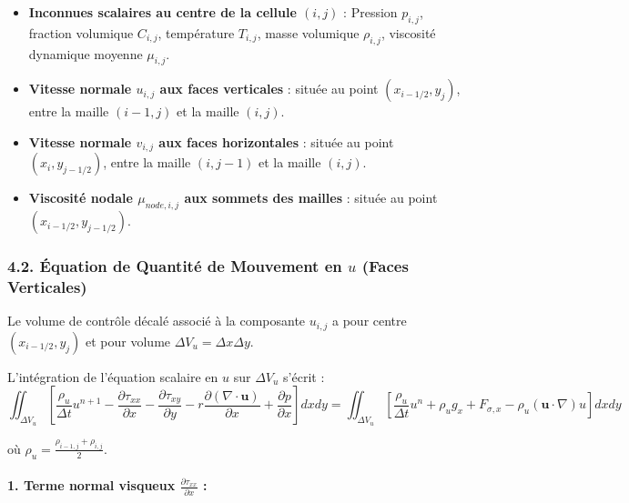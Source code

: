 \documentclass[
  french,
]{article}
\providecommand{\tightlist}{%
  \setlength{\itemsep}{0pt}\setlength{\parskip}{0pt}}
\begin{document}
\begin{itemize}
\tightlist
\item
  \textbf{Inconnues scalaires au centre de la cellule \((i, j)\)} :
  Pression \(p_{i,j}\), fraction volumique \(C_{i,j}\), température
  \(T_{i,j}\), masse volumique \(\rho_{i,j}\), viscosité dynamique
  moyenne \(\mu_{i,j}\).
\item
  \textbf{Vitesse normale \(u_{i, j}\) aux faces verticales} : située au
  point \((x_{i-1/2}, y_j)\), entre la maille \((i-1, j)\) et la maille
  \((i, j)\).
\item
  \textbf{Vitesse normale \(v_{i, j}\) aux faces horizontales} : située
  au point \((x_i, y_{j-1/2})\), entre la maille \((i, j-1)\) et la
  maille \((i, j)\).
\item
  \textbf{Viscosité nodale \(\mu_{node, i, j}\) aux sommets des mailles}
  : située au point \((x_{i-1/2}, y_{j-1/2})\).
\end{itemize}

\subsubsection{\texorpdfstring{4.2. Équation de Quantité de Mouvement en
\(u\) (Faces
Verticales)}{4.2. Équation de Quantité de Mouvement en u (Faces Verticales)}}\label{uxe9quation-de-quantituxe9-de-mouvement-en-u-faces-verticales}

Le volume de contrôle décalé associé à la composante \(u_{i,j}\) a pour
centre \((x_{i-1/2}, y_j)\) et pour volume
\(\Delta V_u = \Delta x \Delta y\).

L'intégration de l'équation scalaire en \(u\) sur \(\Delta V_u\) s'écrit
:
\[\iint_{\Delta V_u} \left[ \frac{\rho_u}{\Delta t} u^{n+1} - \frac{\partial \tau_{xx}}{\partial x} - \frac{\partial \tau_{xy}}{\partial y} - r \frac{\partial (\nabla \cdot \mathbf{u})}{\partial x} + \frac{\partial p}{\partial x} \right] dx dy = \iint_{\Delta V_u} \left[ \frac{\rho_u}{\Delta t} u^n + \rho_u g_x + F_{\sigma, x} - \rho_u (\mathbf{u} \cdot \nabla)u \right] dx dy\]

où \(\rho_u = \frac{\rho_{i-1, j} + \rho_{i, j}}{2}\).

\paragraph{\texorpdfstring{1. Terme normal visqueux
\(\frac{\partial \tau_{xx}}{\partial x}\)
:}{1. Terme normal visqueux \textbackslash frac\{\textbackslash partial \textbackslash tau\_\{xx\}\}\{\textbackslash partial x\} :}}\label{terme-normal-visqueux-fracpartial-tau_xxpartial-x}
\end{document}
